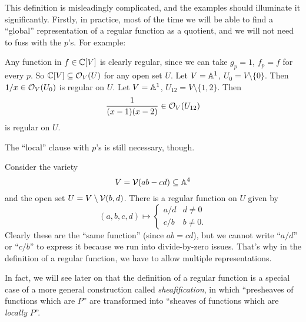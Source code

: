 This definition is misleadingly complicated,
and the examples should illuminate it significantly.
Firstly, in practice, most of the time we will be able to find
a ``global'' representation of a regular function as a quotient,
and we will not need to fuss with the $p$'s.
For example:
\begin{example}
	\listhack
	\begin{enumerate}[(a)]
		\ii Any function in $f \in \mathbb C[V]$ is clearly regular,
		since we can take $g_p = 1$, $f_p = f$ for every $p$.
		So $\mathbb C[V] \subseteq \mathcal O_V(U)$ for any open set $U$.
		\ii Let $V = \mathbb A^1$, $U_0 = V \setminus \{0\}$.
		Then $1/x \in \mathcal O_V(U_0)$ is regular on $U$.
		\ii Let $V = \mathbb A^1$, $U_{12} = V \setminus \{1,2\}$. Then
		\[ \frac{1}{(x-1)(x-2)} \in \mathcal O_V(U_{12}) \]
		is regular on $U$.
	\end{enumerate}
\end{example}
The ``local'' clause with $p$'s is still necessary, though.
\begin{example}
	\label{ex:local_rep}
	Consider the variety
	\[ V = \mathcal V(ab-cd) \subseteq \mathbb A^4 \]
	and the open set $U = V \setminus \mathcal V(b,d)$.
	There is a regular function on $U$ given by
	\[
		(a,b,c,d)
		\mapsto
		\begin{cases}
			a/d & d \neq 0 \\
			c/b & b \neq 0.
		\end{cases}
	\]
	Clearly these are the ``same function'' (since $ab=cd$),
	but we cannot write ``$a/d$'' or ``$c/b$''
	to express it because we run into divide-by-zero issues.
	That's why in the definition of a regular function,
	we have to allow multiple representations.
\end{example}

In fact, we will see later on that the definition
of a regular function is a special case of a more
general construction called \emph{sheafification},
in which ``presheaves of functions which are $P$'' are transformed
into ``sheaves of functions which are \emph{locally} $P$''.

